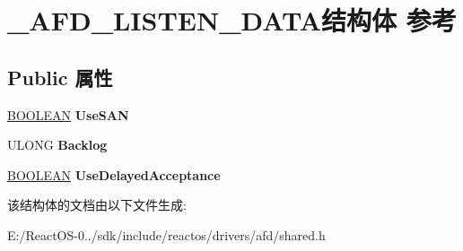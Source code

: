 \hypertarget{struct___a_f_d___l_i_s_t_e_n___d_a_t_a}{}\section{\+\_\+\+A\+F\+D\+\_\+\+L\+I\+S\+T\+E\+N\+\_\+\+D\+A\+T\+A结构体 参考}
\label{struct___a_f_d___l_i_s_t_e_n___d_a_t_a}
\subsection*{Public 属性}
\begin{DoxyCompactItemize}
\item 
\mbox{\label{struct___a_f_d___l_i_s_t_e_n___d_a_t_a_a5797c6743b509ff8bfc0b1b2ccb76106}} 
\hyperlink{_processor_bind_8h_a112e3146cb38b6ee95e64d85842e380a}{B\+O\+O\+L\+E\+AN} {\bfseries Use\+S\+AN}
\item 
\mbox{\label{struct___a_f_d___l_i_s_t_e_n___d_a_t_a_a83de3deeed8aedbd33480f1e22b47d60}} 
U\+L\+O\+NG {\bfseries Backlog}
\item 
\mbox{\label{struct___a_f_d___l_i_s_t_e_n___d_a_t_a_a643bee0c0e0199a36a9105d3ea8ed927}} 
\hyperlink{_processor_bind_8h_a112e3146cb38b6ee95e64d85842e380a}{B\+O\+O\+L\+E\+AN} {\bfseries Use\+Delayed\+Acceptance}
\end{DoxyCompactItemize}


该结构体的文档由以下文件生成\+:\begin{DoxyCompactItemize}
\item 
E\+:/\+React\+O\+S-\/0../sdk/include/reactos/drivers/afd/shared.\+h\end{DoxyCompactItemize}
